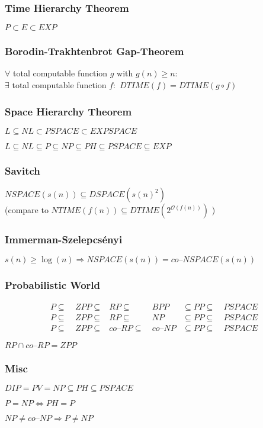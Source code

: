\documentclass[
    13pt,
    oneside,
    a4paper,
    numbers=enddot,
    abstractoff,
    parskip=full
]{scrreprt}
\begin{document}
\subsubsection*{Time Hierarchy Theorem}

$P \subset E \subset EXP$


\subsubsection*{Borodin-Trakhtenbrot Gap-Theorem}

$\forall$ total computable function $g$ with $g(n) \geq n$:\\
$\exists$ total computable function $f:$
    $ DTIME(f) = DTIME (g \circ f) $



\subsubsection*{Space Hierarchy Theorem}

$ L \subseteq NL \subset PSPACE \subset EXPSPACE $

$ L \subseteq NL \subseteq P \subseteq NP \subseteq PH \subseteq PSPACE \subseteq EXP$


\subsubsection*{Savitch}

$ NSPACE(s(n)) \subseteq DSPACE(s(n)^2)$
\\
(compare to $ NTIME(f(n)) \subseteq DTIME(2^{\mathcal{O}(f(n))})$ )


\subsubsection*{Immerman-Szelepcsényi}

$s(n) \geq \log(n) \Longrightarrow NSPACE(s(n)) = co\text{--}NSPACE(s(n))$


\subsubsection*{Probabilistic World}

\begin{align*}
    P \subseteq~& ZPP \subseteq & RP \subseteq~& BPP & \subseteq PP \subseteq~& PSPACE
    \\
    P \subseteq~& ZPP \subseteq & RP \subseteq~& NP & \subseteq PP \subseteq~& PSPACE
    \\
    P \subseteq~& ZPP \subseteq & co\text{--}RP \subseteq~& co\text{--}NP & \subseteq PP \subseteq~& PSPACE
\end{align*}

$ RP \cap co\text{--}RP = ZPP $


\subsubsection*{Misc}

$ DIP = PV = NP \subseteq PH \subseteq PSPACE $

$ P = NP \Longleftrightarrow PH = P $

$ NP \neq co\text{--}NP \Longrightarrow P \neq NP $
\end{document}
